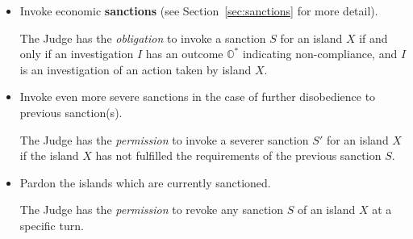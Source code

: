\begin{itemize}
\begin{itemize}
        \item Invoke economic \textbf{sanctions} (see Section~\ref{sec:sanctions} for more detail).
        \begin{rule_IIGO}
            The Judge has the \emph{obligation} to invoke a sanction $S$ for an island $X$ if and only if an investigation $I$ has an outcome $\mathbb{O}^{*}$ indicating non-compliance, and $I$ is an investigation of an action taken by island $X$.
        \end{rule_IIGO}
        \item Invoke even more severe sanctions in the case of further disobedience to previous sanction(s).
        \begin{rule_IIGO}
            The Judge has the \emph{permission} to invoke a severer sanction $S'$ for an island $X$ if the island $X$ has not fulfilled the requirements of the previous sanction $S$.
        \end{rule_IIGO}
        \item Pardon the islands which are currently sanctioned.
        \begin{rule_IIGO}
            The Judge has the \emph{permission} to revoke any sanction $S$ of an island $X$ at a specific turn.
        \end{rule_IIGO}
    \end{itemize}
\end{itemize}


